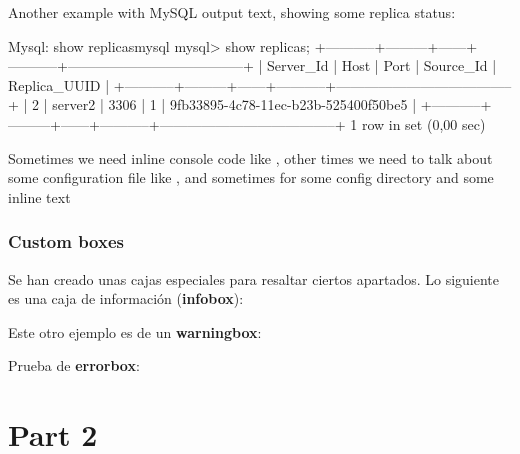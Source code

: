 \documentclass{yukibook}
\begin{document}
Another example with MySQL output text, showing some replica status:

\begin{mycode}{Mysql: show replicas}{mysql}{\footnotesize}
mysql> show replicas;
+-----------+---------+------+-----------+--------------------------------------+
| Server_Id | Host    | Port | Source_Id | Replica_UUID                         |
+-----------+---------+------+-----------+--------------------------------------+
|         2 | server2 | 3306 |         1 | 9fb33895-4c78-11ec-b23b-525400f50be5 |
+-----------+---------+------+-----------+--------------------------------------+
1 row in set (0,00 sec)
\end{mycode}

Sometimes we need inline console code like   , other times we need to talk about some configuration file like , and sometimes for some config directory  and some inline text 



\section{Custom boxes}
Se han creado unas cajas especiales para resaltar ciertos apartados. Lo siguiente es una caja de información (\textbf{infobox}):


Este otro ejemplo es de un \textbf{warningbox}:

Prueba de \textbf{errorbox}:



\part{Part 2}
\Blinddocument

\end{document}
